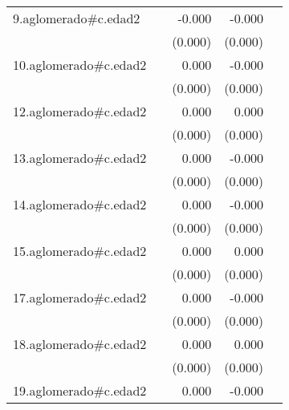 {\begin{longtable}{l*{4}{D{.}{.}{-1}}}
\addlinespace
9.aglomerado#c.edad2&                     &      -0.000         &      -0.000\sym{*}  &                     \\
            &                     &     (0.000)         &     (0.000)         &                     \\
\addlinespace
10.aglomerado#c.edad2&                     &       0.000         &      -0.000\sym{*}  &                     \\
            &                     &     (0.000)         &     (0.000)         &                     \\
\addlinespace
12.aglomerado#c.edad2&                     &       0.000         &       0.000         &                     \\
            &                     &     (0.000)         &     (0.000)         &                     \\
\addlinespace
13.aglomerado#c.edad2&                     &       0.000         &      -0.000         &                     \\
            &                     &     (0.000)         &     (0.000)         &                     \\
\addlinespace
14.aglomerado#c.edad2&                     &       0.000         &      -0.000         &                     \\
            &                     &     (0.000)         &     (0.000)         &                     \\
\addlinespace
15.aglomerado#c.edad2&                     &       0.000         &       0.000         &                     \\
            &                     &     (0.000)         &     (0.000)         &                     \\
\addlinespace
17.aglomerado#c.edad2&                     &       0.000         &      -0.000\sym{*}  &                     \\
            &                     &     (0.000)         &     (0.000)         &                     \\
\addlinespace
18.aglomerado#c.edad2&                     &       0.000         &       0.000\sym{*}  &                     \\
            &                     &     (0.000)         &     (0.000)         &                     \\
\addlinespace
19.aglomerado#c.edad2&                     &       0.000         &      -0.000         &                     \\

\end{longtable}}
